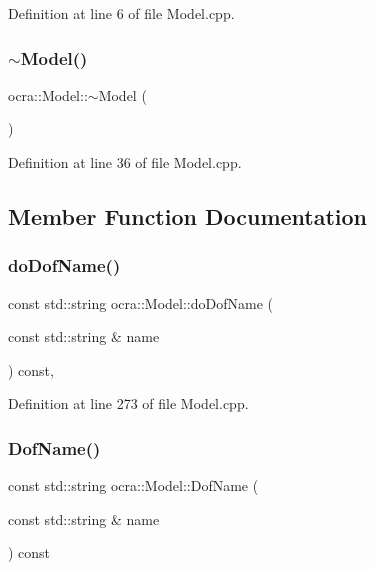Definition at line 6 of file Model.\+cpp.

\hypertarget{classocra_1_1Model_acd9ac3268fc9f79738067bc12292521f}{}\label{classocra_1_1Model_acd9ac3268fc9f79738067bc12292521f} 
\subsubsection{\texorpdfstring{$\sim$\+Model()}{~Model()}}
{\footnotesize\ttfamily ocra\+::\+Model\+::$\sim$\+Model (\begin{DoxyParamCaption}{ }\end{DoxyParamCaption})\hspace{0.3cm}{\ttfamily [virtual]}}



Definition at line 36 of file Model.\+cpp.



\subsection{Member Function Documentation}
\hypertarget{classocra_1_1Model_a664454a77b21d2f5501c2aaf9652c058}{}\label{classocra_1_1Model_a664454a77b21d2f5501c2aaf9652c058} 
\subsubsection{\texorpdfstring{do\+Dof\+Name()}{doDofName()}}
{\footnotesize\ttfamily const std\+::string ocra\+::\+Model\+::do\+Dof\+Name (\begin{DoxyParamCaption}\item[{const std\+::string \&}]{name }\end{DoxyParamCaption}) const\hspace{0.3cm}{\ttfamily [protected]}, {\ttfamily [virtual]}}



Definition at line 273 of file Model.\+cpp.

\hypertarget{classocra_1_1Model_a12d3de75b9a3825f547e860f4318d4cd}{}\label{classocra_1_1Model_a12d3de75b9a3825f547e860f4318d4cd} 
\subsubsection{\texorpdfstring{Dof\+Name()}{DofName()}}
{\footnotesize\ttfamily const std\+::string ocra\+::\+Model\+::\+Dof\+Name (\begin{DoxyParamCaption}\item[{const std\+::string \&}]{name }\end{DoxyParamCaption}) const}



